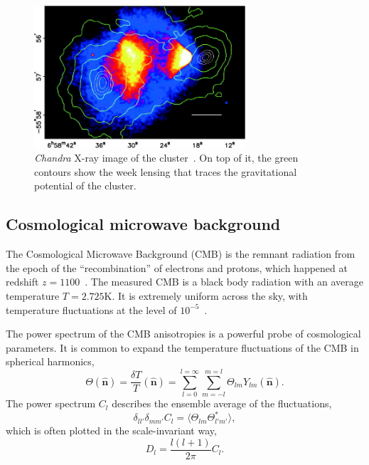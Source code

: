 \documentclass[doublespace,nopageskip]{VTthesis} %
\begin{document}
\begin{figure}[htb]
    \centering
    \includegraphics[width=0.7\textwidth]{Figures/Intro/bullet.jpg}
    \caption{\textit{Chandra} X-ray image of the cluster~\cite{2006ApJ...648L.109C}.  On top of it, the green contours show the week lensing that traces the gravitational potential of the cluster. }
    \label{fig:bullet}
\end{figure}

\subsection{Cosmological microwave background}

The Cosmological Microwave Background (CMB) is the remnant radiation from the epoch of the ``recombination'' of electrons and protons, which happened at redshift $z = 1100$~\cite{2003moco.book.....D}. The measured CMB is a black body radiation with an average temperature $T = 2.725$K. It is extremely uniform across the sky, with temperature fluctuations at the level of $10^{-5}$~\cite{2002ARA&A..40..171H}. 

The power spectrum of the CMB anisotropies is a powerful probe of cosmological parameters. It is common to expand the temperature fluctuations of the CMB in spherical harmonics,
\begin{equation}
    \Theta(\hat{\bm n}) = \frac{\delta T}{T}(\hat{\bm n}) = \sum^{l=\infty}_{l=0}\sum^{m=l}_{m=-l} \Theta_{lm}Y_{lm}(\hat{\bm n}).
\end{equation}
The power spectrum $C_l$ describes the ensemble average of the fluctuations,
\begin{equation}
    \delta_{ll'}\delta_{mm'}C_l = \langle\Theta_{lm}\Theta^*_{l'm'}\rangle,
\end{equation}
which is often plotted in the scale-invariant way,
\begin{equation}
    D_l = \frac{l(l+1)}{2\pi}C_l.
\end{equation}
\end{document}
